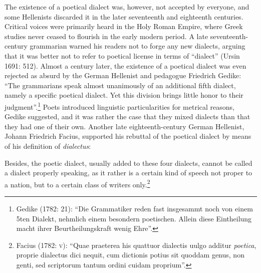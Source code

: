\documentclass[12pt]{article}
\newenvironment{styleStandard}{\renewcommand\baselinestretch{1.25}\setlength\leftskip{0in}\setlength\rightskip{0in}\setlength\parindent{0.1972in}\setlength\parfillskip{0pt plus 1fil}\setlength\parskip{0in plus 1pt}\writerlistparindent\writerlistleftskip\leavevmode\normalfont\normalsize\writerlistlabel\ignorespaces}{\unskip\vspace{0in plus 1pt}\par}
\newenvironment{styleQuote}{\renewcommand\baselinestretch{1.25}\setlength\leftskip{0.3937in}\setlength\rightskip{0in}\setlength\parindent{0in}\setlength\parfillskip{0pt plus 1fil}\setlength\parskip{0.1665in plus 0.016649999in}\writerlistparindent\writerlistleftskip\leavevmode\normalfont\normalsize\writerlistlabel\ignorespaces}{\unskip\vspace{0.1665in plus 0.016649999in}\par}
\newcommand\writerlistleftskip{}
\newcommand\writerlistparindent{}
\newcommand\writerlistlabel{}
\begin{document}
\begin{styleStandard}
The existence of a poetical dialect was, however, not accepted by everyone, and some Hellenists discarded it in the later seventeenth and eighteenth centuries. Critical voices were primarily heard in the Holy Roman Empire, where Greek studies never ceased to flourish in the early modern period. A late seventeenth-century grammarian warned his readers not to forge any new dialects, arguing that it was better not to refer to poetical license in terms of “dialect” (Ursin 1691: 512). Almost a century later, the existence of a poetical dialect was even rejected as absurd by the German Hellenist and pedagogue Friedrich Gedike: “The grammarians speak almost unanimously of an additional fifth dialect, namely a specific poetical dialect. Yet this division brings little honor to their judgment”.\footnote{ Gedike (1782: 21): “Die Grammatiker reden fast insgesammt noch von einem 5ten Dialekt, nehmlich einem besondern poetischen. Allein diese Eintheilung macht ihrer Beurtheilungskraft wenig Ehre”.} Poets introduced linguistic particularities for metrical reasons, Gedike suggested, and it was rather the case that they mixed dialects than that they had one of their own. Another late eighteenth-century German Hellenist, Johann Friedrich Facius, supported his rebuttal of the poetical dialect by means of his definition of \textit{dialectus}:
\end{styleStandard}

\begin{styleQuote}
Besides, the poetic dialect, usually added to these four dialects, cannot be called a dialect properly speaking, as it rather is a certain kind of speech not proper to a nation, but to a certain class of writers only.\footnote{ Facius (1782: \textsc{v}): “Quae praeterea his quattuor dialectis uulgo additur \textit{poetica}, proprie dialectus dici nequit, cum dictionis potius sit quoddam genus, non genti, sed scriptorum tantum ordini cuidam proprium”.}
\end{styleQuote}
\end{document}
